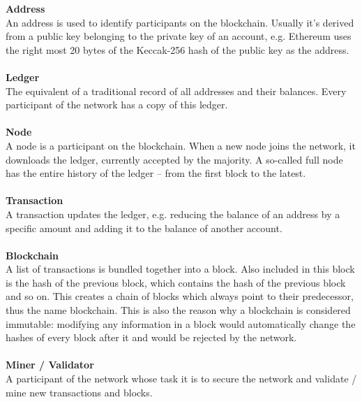 \textbf{Address}\\
An address is used to identify participants on the blockchain. Usually it's derived from a public key belonging to the private key of an account, e.g. Ethereum  uses the right most 20 bytes of the Keccak-256 hash of the public key as the address\cite{ethereum-yellow-paper}.
\\\\

\textbf{Ledger}\\
The equivalent of a traditional record of all addresses and their balances. Every participant of the network has a copy of this ledger.
\\\\

\textbf{Node}\\
A node is a participant on the blockchain. When a new node joins the network, it downloads the ledger, currently accepted by the majority. A so-called full node has the entire history of the ledger – from the first block to the latest.
\\\\

\textbf{Transaction}\\
A transaction updates the ledger, e.g. reducing the balance of an address by a specific amount and adding it to the balance of another account.
\\\\

\textbf{Blockchain}\\
A list of transactions is bundled together into a block. Also included in this block is the hash of the previous block, which contains the hash of the previous block and so on. This creates a chain of blocks\cite{bitcoin-whitepaper} which always point to their predecessor, thus the name blockchain. This is also the reason why a blockchain is considered immutable: modifying any information in a block would automatically change the hashes of every block after it and would be rejected by the network.
\\\\

\textbf{Miner / Validator}\\
A participant of the network whose task it is to secure the network and validate / mine new transactions and blocks.
\\\\

